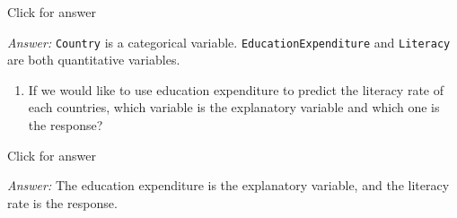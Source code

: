 \documentclass[
]{book}
\providecommand{\tightlist}{%
  \setlength{\itemsep}{0pt}\setlength{\parskip}{0pt}}
\begin{document}
Click for answer

\emph{Answer:} \texttt{Country} is a categorical variable. \texttt{EducationExpenditure} and \texttt{Literacy} are both quantitative variables.

\begin{enumerate}
\def\labelenumi{\alph{enumi}.}
\setcounter{enumi}{4}
\tightlist
\item
  If we would like to use education expenditure to predict the literacy rate of each countries, which variable is the explanatory variable and which one is the response?
\end{enumerate}

Click for answer

\emph{Answer:} The education expenditure is the explanatory variable, and the literacy rate is the response.

  
\end{document}
